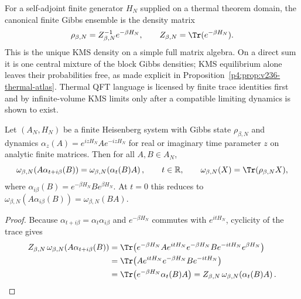 \documentclass[12pt,a4paper]{article}
\begin{document}
For a self-adjoint finite generator \(H_N\) supplied on a thermal theorem
domain, the canonical finite Gibbs ensemble is the density matrix
\begin{equation}
\label{p4:eq:finite-thermal-gibbs-native}
\rho_{\beta,N}=Z_{\beta,N}^{-1}e^{-\beta H_N},
\qquad
Z_{\beta,N}=\Tr(e^{-\beta H_N}).
\end{equation}
This is the unique KMS density on a simple full matrix algebra.  On a direct
sum it is one central mixture of the block Gibbs densities; KMS equilibrium
alone leaves their probabilities free, as made explicit in
Proposition~\ref{p4:prop:v236-thermal-atlas}.
Thermal QFT language is licensed by finite trace identities first and by infinite-volume KMS limits only after a compatible limiting dynamics is shown to exist.

\begin{theorem}
\label{p4:thm:finite-thermal-kms-kinetic-interface}
Let \((A_N,H_N)\) be a finite Heisenberg system with Gibbs state \(\rho_{\beta,N}\) and dynamics \(\alpha_z(A)=e^{izH_N}Ae^{-izH_N}\) for real or imaginary time parameter \(z\) on analytic finite matrices.  Then for all \(A,B\in A_N\),
\begin{equation}
\label{p4:eq:finite-kms-native}
\omega_{\beta,N}\!\left(A\alpha_{t+i\beta}(B)\right)
=
\omega_{\beta,N}\!\left(\alpha_t(B)A\right),
\qquad t\in\mathbb R,
\qquad
\omega_{\beta,N}(X)=\Tr(\rho_{\beta,N}X),
\end{equation}
where
\(\alpha_{i\beta}(B)=e^{-\beta H_N}Be^{\beta H_N}\).
At \(t=0\) this reduces to
\(\omega_{\beta,N}(A\alpha_{i\beta}(B))
=\omega_{\beta,N}(BA)\).
\end{theorem}


\begin{proof}
Because \(\alpha_{t+i\beta}=\alpha_t\alpha_{i\beta}\) and
\(e^{-\beta H_N}\) commutes with \(e^{itH_N}\), cyclicity of the trace gives
\[
\begin{aligned}
Z_{\beta,N}\,
\omega_{\beta,N}\!\left(A\alpha_{t+i\beta}(B)\right)
&=
\Tr\!\left(
e^{-\beta H_N}A e^{itH_N}e^{-\beta H_N}
B e^{-itH_N}e^{\beta H_N}
\right)\\
&=
\Tr\!\left(Ae^{itH_N}e^{-\beta H_N}Be^{-itH_N}\right)\\
&=
\Tr\!\left(e^{-\beta H_N}\alpha_t(B)A\right)
=
Z_{\beta,N}\,
\omega_{\beta,N}\!\left(\alpha_t(B)A\right).
\end{aligned}
\]
\end{proof}
\end{document}
